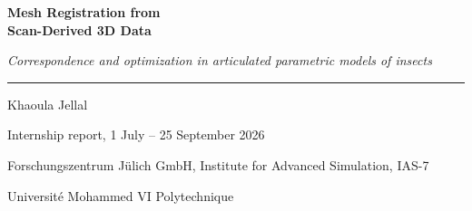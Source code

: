 \thispagestyle{empty}
\vspace*{0.35\textheight}
\begin{center}
{\fontsize{20}{25}\selectfont\bfseries\color{accent} Mesh Registration from\\ Scan-Derived 3D Data\par}
\vspace{0.6cm}
{\large\itshape Correspondence and optimization in articulated parametric models of insects\par}
\vspace{1.2cm}
\textcolor{rule}{\rule{0.4\linewidth}{0.6pt}}\par
\vspace{0.8cm}
Khaoula Jellal\par
Internship report, 1 July -- 25 September 2026\par
\vspace{0.4cm}
Forschungszentrum J\"ulich GmbH, Institute for Advanced Simulation, IAS-7\par
Universit\'e Mohammed VI Polytechnique\par
\end{center}
